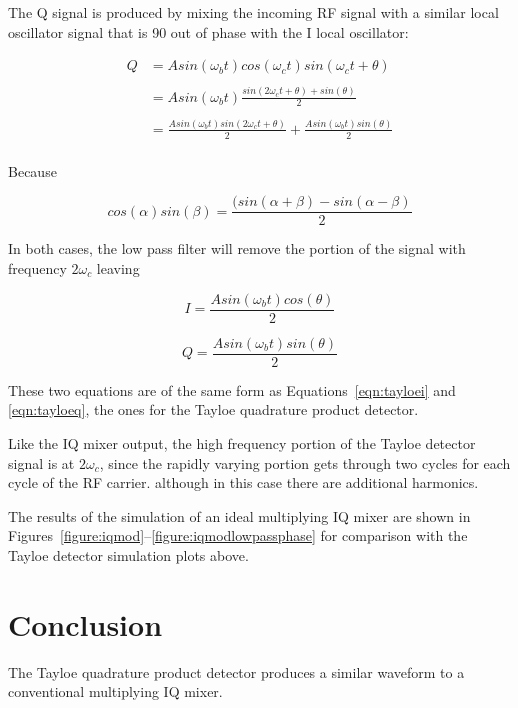 \documentclass[11pt, twoside]{article}
\begin{document}
The Q signal is produced by mixing the incoming RF signal with a
similar local oscillator signal that is 90{\degree} out of phase with
the I local oscillator:


\begin{align*}
  Q& = A sin({\omega_b}t) cos({\omega}_ct) sin({\omega}_ct + \theta) \\
  \\
  & = A sin({\omega_b}t) \frac{sin(2{\omega}_ct + \theta) + sin(\theta)}{2}\\
  \\
& = \frac{A sin({\omega_b}t)sin(2{\omega}_ct + \theta)}{2} + \frac{A sin({\omega_b}t)sin(\theta)}{2}\\
\end{align*}

Because

\begin{equation*}
  cos(\alpha)sin(\beta) = \frac{(sin(\alpha + \beta) - sin(\alpha - \beta)}{2} 
\end{equation*}

In both cases, the low pass filter will remove the portion of the
signal with frequency $2{\omega_c}$ leaving

\begin{equation*}
  I = \frac{A sin({\omega_b}t)cos(\theta)}{2}
\end{equation*}

\begin{equation*}
  Q = \frac{A sin({\omega_b}t)sin(\theta)}{2}
\end{equation*}

These two equations are of the same form as
Equations~\ref{eqn:tayloei} and \ref{eqn:tayloeq}, the ones for the
Tayloe quadrature product detector.

Like the IQ mixer output, the high frequency portion of the Tayloe
detector signal is at $2\omega_c$, since the rapidly varying portion gets
through two cycles for each cycle of the RF carrier.  although in this
case there are additional harmonics.

The results of the simulation of an ideal multiplying IQ mixer are
shown in Figures~\ref{figure:iqmod}--\ref{figure:iqmodlowpassphase}
for comparison with the Tayloe detector simulation plots above.

\section{Conclusion}

The Tayloe quadrature product detector produces a similar waveform to
a conventional multiplying IQ mixer.
\end{document}
